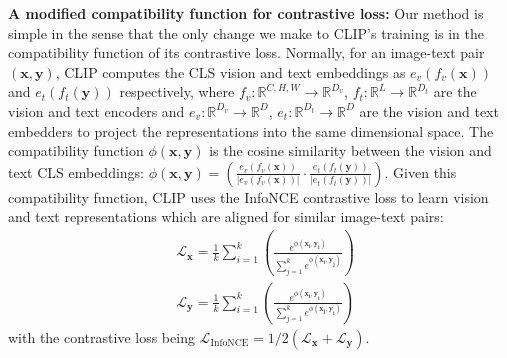 \documentclass[10pt,twocolumn,letterpaper]{article}
\begin{document}
\textbf{A modified compatibility function for contrastive loss:} Our method is simple in the sense that the only change we make to CLIP's training is in the compatibility function of its contrastive loss. Normally, for an image-text pair $(\mathbf{x}, \mathbf{y})$, CLIP computes the CLS vision and text embeddings as $e_v(f_v(\mathbf{x}))$ and $e_t(f_t(\mathbf{y}))$ respectively, where $f_v: \mathbb{R}^{C,H,W} \rightarrow \mathbb{R}^{D_v}$, $f_t: \mathbb{R}^{L} \rightarrow \mathbb{R}^{D_t}$ are the vision and text encoders and $e_v: \mathbb{R}^{D_v} \rightarrow \mathbb{R}^{D}$, $e_t: \mathbb{R}^{D_t} \rightarrow \mathbb{R}^{D}$ are the vision and text embedders to project the representations into the same dimensional space. The compatibility function $\phi(\mathbf{x}, \mathbf{y})$ is the cosine similarity between the vision and text CLS embeddings: $\phi(\mathbf{x}, \mathbf{y}) = \left(\frac{e_v(f_v(\mathbf{x}))}{|e_v(f_v(\mathbf{x}))|} \cdot \frac{e_t(f_t(\mathbf{y}))}{|e_t(f_t(\mathbf{y}))|}\right)$. Given this compatibility function, CLIP uses the InfoNCE \cite{oord2018representation} contrastive loss to learn vision and text representations which are aligned for similar image-text pairs:
\begin{equation}
\begin{split}
    & \mathcal{L}_{\mathbf{x}} = \frac{1}{k} \sum_{i=1}^{k} \left(\frac{e^{\phi(\mathbf{x_i}, \mathbf{y_i})}}{\sum_{j=1}^k e^{\phi(\mathbf{x_i},\mathbf{y_j})}}\right) \\
    & \mathcal{L}_{\mathbf{y}} = \frac{1}{k} \sum_{i=1}^{k} \left(\frac{e^{\phi(\mathbf{x_i}, \mathbf{y_i})}}{\sum_{j=1}^k e^{\phi(\mathbf{x_j},\mathbf{y_i})}}\right)
\end{split}
\end{equation}
with the contrastive loss being $\mathcal{L}_\mathrm{InfoNCE} = 1/2 (\mathcal{L}_{\mathbf{x}} + \mathcal{L}_{\mathbf{y}})$.
\end{document}
